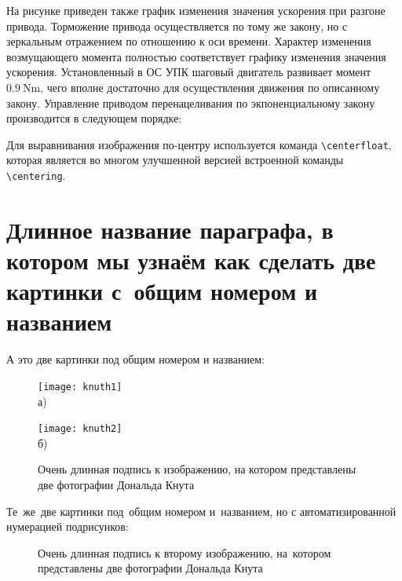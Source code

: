 На рисунке приведен также график изменения значения ускорения при разгоне привода. Торможение привода осуществляется по тому же закону, но с зеркальным отражением по отношению к оси времени. Характер изменения возмущающего момента полностью соответствует графику изменения значения ускорения. Установленный в ОС УПК шаговый двигатель развивает момент $\SI{0,9}{\newton\meter}$, чего вполне достаточно для осуществления движения по описанному закону.
Управление приводом перенацеливания по экпоненциальному закону производится в следующем порядке:






Для выравнивания изображения по-центру используется команда \verb+\centerfloat+, которая является во
многом улучшенной версией встроенной команды \verb+\centering+.

\section{Длинное название параграфа, в котором мы узнаём как сделать две картинки с~общим номером и названием}\label{sec:ch2/sect2}

А это две картинки под общим номером и названием:
\begin{figure}[ht]
    \begin{minipage}[b][][b]{0.49\linewidth}\centering
        \texttt{[image: knuth1]} \\ а)
    \end{minipage}
    \hfill
    \begin{minipage}[b][][b]{0.49\linewidth}\centering
        \texttt{[image: knuth2]} \\ б)
    \end{minipage}
    \caption{Очень длинная подпись к изображению,
        на котором представлены две фотографии Дональда Кнута}
    \label{fig:knuth}
\end{figure}

Те~же~две картинки под~общим номером и~названием,
но с автоматизированной нумерацией подрисунков:
\begin{figure}[ht]
    \caption[Этот текст попадает в названия рисунков в списке рисунков]{Очень
        длинная подпись к второму изображению, на~котором представлены две
        фотографии Дональда Кнута}\label{fig:knuth_2}
\end{figure}


